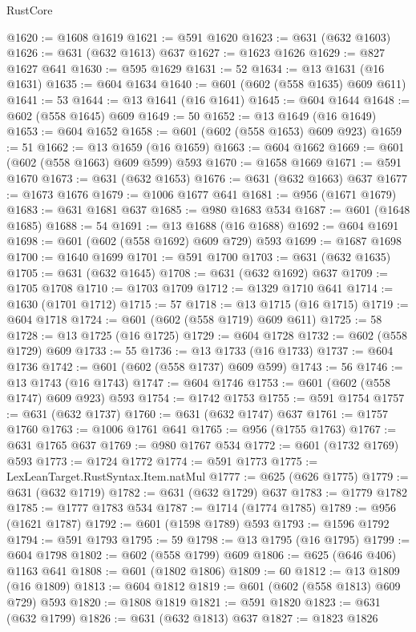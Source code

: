 \begin{lexlean}{RustCore}
\begin{coremodule}
@1620 := @1608 @1619
@1621 := @591 @1620
@1623 := @631 (@632 @1603)
@1626 := @631 (@632 @1613) @637
@1627 := @1623 @1626
@1629 := @827 @1627 @641
@1630 := @595 @1629
@1631 := 52
@1634 := @13 @1631 (@16 @1631)
@1635 := @604 @1634
@1640 := @601 (@602 (@558 @1635) @609 @611)
@1641 := 53
@1644 := @13 @1641 (@16 @1641)
@1645 := @604 @1644
@1648 := @602 (@558 @1645) @609
@1649 := 50
@1652 := @13 @1649 (@16 @1649)
@1653 := @604 @1652
@1658 := @601 (@602 (@558 @1653) @609 @923)
@1659 := 51
@1662 := @13 @1659 (@16 @1659)
@1663 := @604 @1662
@1669 := @601 (@602 (@558 @1663) @609 @599) @593
@1670 := @1658 @1669
@1671 := @591 @1670
@1673 := @631 (@632 @1653)
@1676 := @631 (@632 @1663) @637
@1677 := @1673 @1676
@1679 := @1006 @1677 @641
@1681 := @956 (@1671 @1679)
@1683 := @631 @1681 @637
@1685 := @980 @1683 @534
@1687 := @601 (@1648 @1685)
@1688 := 54
@1691 := @13 @1688 (@16 @1688)
@1692 := @604 @1691
@1698 := @601 (@602 (@558 @1692) @609 @729) @593
@1699 := @1687 @1698
@1700 := @1640 @1699
@1701 := @591 @1700
@1703 := @631 (@632 @1635)
@1705 := @631 (@632 @1645)
@1708 := @631 (@632 @1692) @637
@1709 := @1705 @1708
@1710 := @1703 @1709
@1712 := @1329 @1710 @641
@1714 := @1630 (@1701 @1712)
@1715 := 57
@1718 := @13 @1715 (@16 @1715)
@1719 := @604 @1718
@1724 := @601 (@602 (@558 @1719) @609 @611)
@1725 := 58
@1728 := @13 @1725 (@16 @1725)
@1729 := @604 @1728
@1732 := @602 (@558 @1729) @609
@1733 := 55
@1736 := @13 @1733 (@16 @1733)
@1737 := @604 @1736
@1742 := @601 (@602 (@558 @1737) @609 @599)
@1743 := 56
@1746 := @13 @1743 (@16 @1743)
@1747 := @604 @1746
@1753 := @601 (@602 (@558 @1747) @609 @923) @593
@1754 := @1742 @1753
@1755 := @591 @1754
@1757 := @631 (@632 @1737)
@1760 := @631 (@632 @1747) @637
@1761 := @1757 @1760
@1763 := @1006 @1761 @641
@1765 := @956 (@1755 @1763)
@1767 := @631 @1765 @637
@1769 := @980 @1767 @534
@1772 := @601 (@1732 @1769) @593
@1773 := @1724 @1772
@1774 := @591 @1773
@1775 := LexLeanTarget.RustSyntax.Item.natMul
@1777 := @625 (@626 @1775)
@1779 := @631 (@632 @1719)
@1782 := @631 (@632 @1729) @637
@1783 := @1779 @1782
@1785 := @1777 @1783 @534
@1787 := @1714 (@1774 @1785)
@1789 := @956 (@1621 @1787)
@1792 := @601 (@1598 @1789) @593
@1793 := @1596 @1792
@1794 := @591 @1793
@1795 := 59
@1798 := @13 @1795 (@16 @1795)
@1799 := @604 @1798
@1802 := @602 (@558 @1799) @609
@1806 := @625 (@646 @406) @1163 @641
@1808 := @601 (@1802 @1806)
@1809 := 60
@1812 := @13 @1809 (@16 @1809)
@1813 := @604 @1812
@1819 := @601 (@602 (@558 @1813) @609 @729) @593
@1820 := @1808 @1819
@1821 := @591 @1820
@1823 := @631 (@632 @1799)
@1826 := @631 (@632 @1813) @637
@1827 := @1823 @1826

\end{coremodule}
\end{lexlean}
